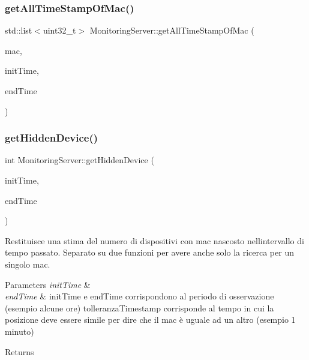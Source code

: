 \subsubsection{\texorpdfstring{get\+All\+Time\+Stamp\+Of\+Mac()}{getAllTimeStampOfMac()}}
{\footnotesize\ttfamily std\+::list$<$uint32\+\_\+t$>$ Monitoring\+Server\+::get\+All\+Time\+Stamp\+Of\+Mac (\begin{DoxyParamCaption}\item[{Q\+String}]{mac,  }\item[{uint32\+\_\+t}]{init\+Time,  }\item[{uint32\+\_\+t}]{end\+Time }\end{DoxyParamCaption})}

\mbox{\label{class_monitoring_server_ae86353505417c1ee5510dd4fcaee972c}} 
\subsubsection{\texorpdfstring{get\+Hidden\+Device()}{getHiddenDevice()}}
{\footnotesize\ttfamily int Monitoring\+Server\+::get\+Hidden\+Device (\begin{DoxyParamCaption}\item[{uint32\+\_\+t}]{init\+Time,  }\item[{uint32\+\_\+t}]{end\+Time }\end{DoxyParamCaption})}

Restituisce una stima del numero di dispositivi con mac nascosto nell\textquotesingle{}intervallo di tempo passato. Separato su due funzioni per avere anche solo la ricerca per un singolo mac. 
\begin{DoxyParams}{Parameters}
{\em init\+Time} & \\
\hline
{\em end\+Time} & init\+Time e end\+Time corrispondono al periodo di osservazione (esempio alcune ore) tolleranza\+Timestamp corrisponde al tempo in cui la posizione deve essere simile per dire che il mac è uguale ad un altro (esempio 1 minuto)\\
\hline
\end{DoxyParams}
\begin{DoxyReturn}{Returns}

\end{DoxyReturn}
\mbox{\label{class_monitoring_server_a3bafba709daa02510e3194d91fd86170}} 
